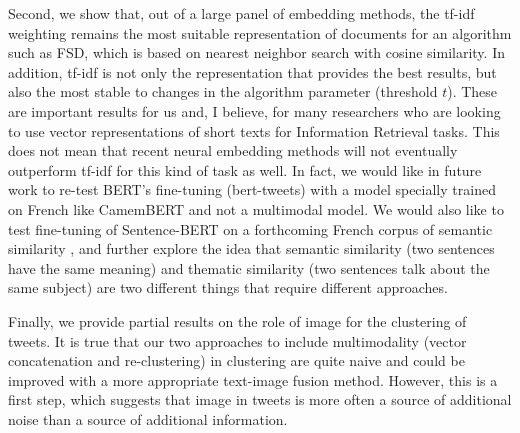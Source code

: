 Second, we show that, out of a large panel of embedding methods, the tf-idf weighting remains the most suitable representation of documents for an algorithm such as FSD, which is based on nearest neighbor search with cosine similarity. In addition, tf-idf is not only the representation that provides the best results, but also the most stable to changes in the algorithm parameter (threshold $t$). These are important results for us and, I believe, for many researchers who are looking to use vector representations of short texts for Information Retrieval tasks. This does not mean that recent neural embedding methods will not eventually outperform tf-idf for this kind of task as well. In fact, we would like in future work to re-test BERT's fine-tuning (bert-tweets) with a model specially trained on French like CamemBERT \citep{martin2020camembert} and not a multimodal model. We would also like to test fine-tuning of Sentence-BERT on a forthcoming French corpus of semantic similarity \citep{cardon2020french}, and further explore the idea that semantic similarity (two sentences have the same meaning) and thematic similarity (two sentences talk about the same subject) are two different things that require different approaches.

Finally, we provide partial results on the role of image for the clustering of tweets. It is true that our two approaches to include multimodality (vector concatenation and re-clustering) in clustering are quite naive and could be improved with a more appropriate text-image fusion method. However, this is a first step, which suggests that image in tweets is more often a source of additional noise than a source of additional information.




